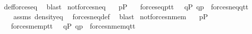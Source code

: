 \begin{isabellebody}
\ def{\isacharunderscore}{\kern0pt}forces{\isacharunderscore}{\kern0pt}eq\ \isamarkupfalse%
\ blast\isanewline
{}\isamarkupfalse%
%
\endisatagproof
{\isafoldproof}%
%
\isadelimproof
%
\endisadelimproof
%
\isadelimdocument
%
\endisadelimdocument
%
\isatagdocument
%
\isamarkuptrue%
%
\endisatagdocument
{\isafolddocument}%
%
\isadelimdocument
%
\endisadelimdocument
{}\isamarkupfalse%
\ not{\isacharunderscore}{\kern0pt}forces{\isacharunderscore}{\kern0pt}neq{\isacharcolon}{\kern0pt}\isanewline
\ \ \ {\isachardoublequoteopen}p{\isasymin}P{\isachardoublequoteclose}\isanewline
\ \ \ {\isachardoublequoteopen}forces{\isacharunderscore}{\kern0pt}eq{\isacharparenleft}{\kern0pt}p{\isacharcomma}{\kern0pt}t{}{\isacharcomma}{\kern0pt}t{}{\isacharparenright}{\kern0pt}\ {\isasymlongleftrightarrow}\ {\isasymnot}\ {\isacharparenleft}{\kern0pt}{\isasymexists}q{\isasymin}P{\isachardot}{\kern0pt}\ q{\isasympreceq}p\ {\isasymand}\ forces{\isacharunderscore}{\kern0pt}neq{\isacharparenleft}{\kern0pt}q{\isacharcomma}{\kern0pt}t{}{\isacharcomma}{\kern0pt}t{}{\isacharparenright}{\kern0pt}{\isacharparenright}{\kern0pt}{\isachardoublequoteclose}\isanewline
%
\isadelimproof
\ \ %
\endisadelimproof
%
\isatagproof
{}\isamarkupfalse%
\ assms\ density{\isacharunderscore}{\kern0pt}eq\ \isamarkupfalse%
\ forces{\isacharunderscore}{\kern0pt}neq{\isacharunderscore}{\kern0pt}def\ \isamarkupfalse%
\ blast%
\endisatagproof
{\isafoldproof}%
%
\isadelimproof
\isanewline
%
\endisadelimproof
\isanewline
\isanewline
{}\isamarkupfalse%
\ not{\isacharunderscore}{\kern0pt}forces{\isacharunderscore}{\kern0pt}nmem{\isacharcolon}{\kern0pt}\isanewline
\ \ \ {\isachardoublequoteopen}p{\isasymin}P{\isachardoublequoteclose}\isanewline
\ \ \ {\isachardoublequoteopen}forces{\isacharunderscore}{\kern0pt}mem{\isacharparenleft}{\kern0pt}p{\isacharcomma}{\kern0pt}t{}{\isacharcomma}{\kern0pt}t{}{\isacharparenright}{\kern0pt}\ {\isasymlongleftrightarrow}\ {\isasymnot}\ {\isacharparenleft}{\kern0pt}{\isasymexists}q{\isasymin}P{\isachardot}{\kern0pt}\ q{\isasympreceq}p\ {\isasymand}\ forces{\isacharunderscore}{\kern0pt}nmem{\isacharparenleft}{\kern0pt}q{\isacharcomma}{\kern0pt}t{}{\isacharcomma}{\kern0pt}t{}{\isacharparenright}{\kern0pt}{\isacharparenright}{\kern0pt}{\isachardoublequoteclose}\isanewline

\end{isabellebody}
